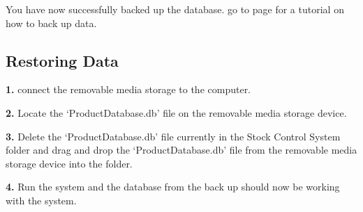 You have now successfully backed up the database. go to page \pageref{fig:Restoring Data} for a tutorial on how to back up data.

\subsection{Restoring Data}
\label{fig:Restoring Data}

\textbf{1.} connect the removable media storage to the computer.

\textbf{2.} Locate the `ProductDatabase.db' file on the removable media storage device.

\textbf{3.} Delete the `ProductDatabase.db' file currently in the Stock Control System folder and drag and drop the `ProductDatabase.db' file from the removable media storage device into the folder.

\textbf{4.} Run the system and the database from the back up should now be working with the system.

\stopcontents[chapters]
